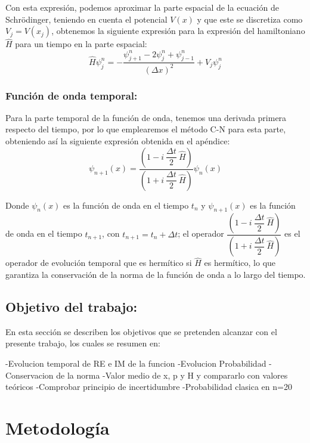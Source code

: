 \documentclass[10pt,onecolumn]{article}
\begin{document}
Con esta expresión, podemos aproximar la parte espacial de la ecuación de Schrödinger, teniendo en cuenta el potencial $V(x)$ y que este se discretiza como $V_{j} = V(x_j)$, obtenemos la siguiente expresión para la expresión del hamiltoniano $\hat{H}$ para un tiempo en la parte espacial:
\begin{equation}
    \hat{H} \psi_{j}^{n} = -\dfrac{\psi_{j+1}^{n} - 2\psi_{j}^{n} + \psi_{j-1}^{n}}{(\Delta x)^2} + V_{j} \psi_{j}^{n}
\end{equation}




\subsubsection{Función de onda temporal:}
Para la parte temporal de la función de onda, tenemos una derivada primera respecto del tiempo, por lo que emplearemos el método C-N para esta parte, obteniendo así la siguiente expresión obtenida en el apéndice:
\begin{equation}
    \psi_{n+1}(x) =\dfrac{(1 - i\ \dfrac{\Delta t}{2}\ \hat{H})}{(1 + i\ \dfrac{\Delta t}{2}\ \hat{H})}\psi_n(x)
\end{equation}

Donde $\psi_n(x)$ es la función de onda en el tiempo $t_n$ y $\psi_{n+1}(x)$ es la función de onda en el tiempo $t_{n+1}$, con $t_{n+1} = t_n + \Delta t$; el operador $\dfrac{(1 - i\ \dfrac{\Delta t}{2}\ \hat{H})}{(1 + i\ \dfrac{\Delta t}{2}\ \hat{H})}$ es el operador de evolución temporal que es hermítico si $\hat{H}$ es hermítico, lo que garantiza la conservación de la norma de la función de onda a lo largo del tiempo.






\subsection{Objetivo del trabajo:}
En esta sección se describen los objetivos que se pretenden alcanzar con el presente trabajo, los cuales se resumen en:

-Evolucion temporal de RE e IM de la funcion
-Evolucion Probabilidad
-Conservacion de la norma
-Valor medio de x, p y H y compararlo con valores teóricos
-Comprobar principio de incertidumbre
-Probabilidad clasica en n=20

\section{Metodología}
\end{document}
